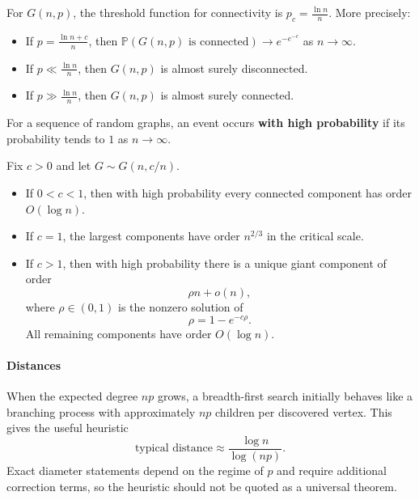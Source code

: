\begin{theorem}
For $G(n,p)$, the threshold function for connectivity is $p_c = \frac{\ln n}{n}$. More precisely:
\begin{itemize}
\item If $p = \frac{\ln n + c}{n}$, then $\mathbb{P}(G(n,p) \text{ is connected}) \to e^{-e^{-c}}$ as $n \to \infty$.
\item If $p \ll \frac{\ln n}{n}$, then $G(n,p)$ is almost surely disconnected.
\item If $p \gg \frac{\ln n}{n}$, then $G(n,p)$ is almost surely connected.
\end{itemize}
\end{theorem}

\begin{remark}
For a sequence of random graphs, an event occurs \textbf{with high probability} if its probability tends to $1$ as $n\to\infty$.
\end{remark}

\begin{theorem}
Fix $c>0$ and let $G\sim G(n,c/n)$.
\begin{itemize}
    \item If $0<c<1$, then with high probability every connected component has order $O(\log n)$.
    \item If $c=1$, the largest components have order $n^{2/3}$ in the critical scale.
    \item If $c>1$, then with high probability there is a unique giant component of order
    \[
        \rho n+o(n),
    \]
    where $\rho\in(0,1)$ is the nonzero solution of
    \[
        \rho=1-e^{-c\rho}.
    \]
    All remaining components have order $O(\log n)$.
\end{itemize}
\end{theorem}

\paragraph{Distances}
When the expected degree $np$ grows, a breadth-first search initially behaves like a branching process with approximately $np$ children per discovered vertex. This gives the useful heuristic
\[
    \text{typical distance}\approx\frac{\log n}{\log(np)}.
\]
Exact diameter statements depend on the regime of $p$ and require additional correction terms, so the heuristic should not be quoted as a universal theorem.

